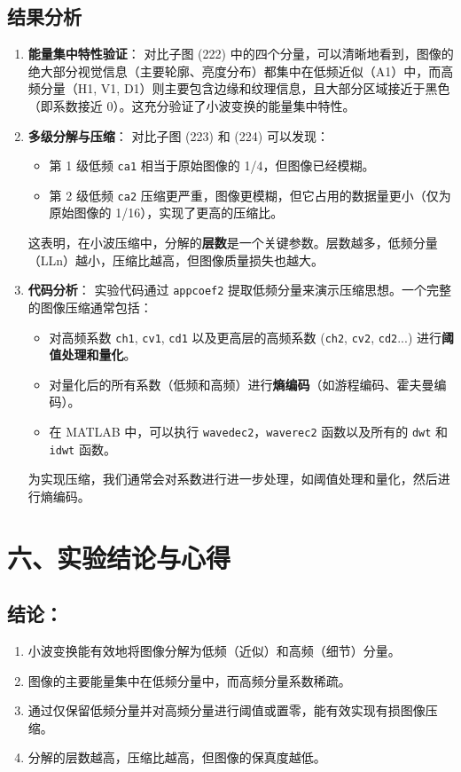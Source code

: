 \documentclass[12pt, a4paper]{article}
\begin{document}
\subsection*{\centering 结果分析}
\begin{enumerate}
    \item \textbf{能量集中特性验证}： 对比子图 (222) 中的四个分量，可以清晰地看到，图像的绝大部分视觉信息（主要轮廓、亮度分布）都集中在低频近似（A1）中，而高频分量（H1, V1, D1）则主要包含边缘和纹理信息，且大部分区域接近于黑色（即系数接近 0）。这充分验证了小波变换的能量集中特性。
    \item \textbf{多级分解与压缩}： 对比子图 (223) 和 (224) 可以发现：
    \begin{itemize}
        \item 第 1 级低频 \texttt{ca1} 相当于原始图像的 1/4，但图像已经模糊。
        \item 第 2 级低频 \texttt{ca2} 压缩更严重，图像更模糊，但它占用的数据量更小（仅为原始图像的 1/16），实现了更高的压缩比。
    \end{itemize}
    这表明，在小波压缩中，分解的\textbf{层数}是一个关键参数。层数越多，低频分量（LLn）越小，压缩比越高，但图像质量损失也越大。
    \item \textbf{代码分析}： 实验代码通过 \texttt{appcoef2} 提取低频分量来演示压缩思想。一个完整的图像压缩通常包括：
    \begin{itemize}
        \item 对高频系数 \texttt{ch1}, \texttt{cv1}, \texttt{cd1} 以及更高层的高频系数 (\texttt{ch2}, \texttt{cv2}, \texttt{cd2}...) 进行\textbf{阈值处理和量化}。
        \item 对量化后的所有系数（低频和高频）进行\textbf{熵编码}（如游程编码、霍夫曼编码）。
        \item 在 MATLAB 中，可以执行 \texttt{wavedec2}，\texttt{waverec2} 函数以及所有的 \texttt{dwt} 和 \texttt{idwt} 函数。
    \end{itemize}
    为实现压缩，我们通常会对系数进行进一步处理，如阈值处理和量化，然后进行熵编码。
\end{enumerate}

\section*{\centering 六、实验结论与心得}
\subsection*{\centering 结论：}
\begin{enumerate}
    \item 小波变换能有效地将图像分解为低频（近似）和高频（细节）分量。
    \item 图像的主要能量集中在低频分量中，而高频分量系数稀疏。
    \item 通过仅保留低频分量并对高频分量进行阈值或置零，能有效实现有损图像压缩。
    \item 分解的层数越高，压缩比越高，但图像的保真度越低。
\end{enumerate}
\end{document}

